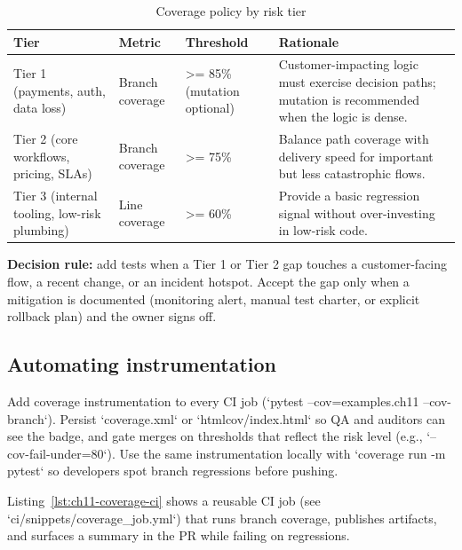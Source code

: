 \begin{table}[h]
\centering
\caption{Coverage policy by risk tier}
\label{tab:coverage-policy-by-tier}
\begin{tabular}{p{3cm}p{3cm}p{3cm}p{5cm}}
\toprule
Tier & Metric & Threshold & Rationale \\
\midrule
Tier 1 (payments, auth, data loss) & Branch coverage & >= 85\% (mutation optional) & Customer-impacting logic must exercise decision paths; mutation is recommended when the logic is dense. \\
Tier 2 (core workflows, pricing, SLAs) & Branch coverage & >= 75\% & Balance path coverage with delivery speed for important but less catastrophic flows. \\
Tier 3 (internal tooling, low-risk plumbing) & Line coverage & >= 60\% & Provide a basic regression signal without over-investing in low-risk code. \\
\bottomrule
\end{tabular}
\end{table}

\textbf{Decision rule:} add tests when a Tier 1 or Tier 2 gap touches a customer-facing flow, a recent change, or an incident hotspot. Accept the gap only when a mitigation is documented (monitoring alert, manual test charter, or explicit rollback plan) and the owner signs off.

\subsection{Automating instrumentation}
Add coverage instrumentation to every CI job (`pytest --cov=examples.ch11 --cov-branch`). Persist `coverage.xml` or `htmlcov/index.html` so QA and auditors can see the badge, and gate merges on thresholds that reflect the risk level (e.g., `--cov-fail-under=80`). Use the same instrumentation locally with `coverage run -m pytest` so developers spot branch regressions before pushing.

Listing~\ref{lst:ch11-coverage-ci} shows a reusable CI job (see `ci/snippets/coverage_job.yml`) that runs branch coverage, publishes artifacts, and surfaces a summary in the PR while failing on regressions.

